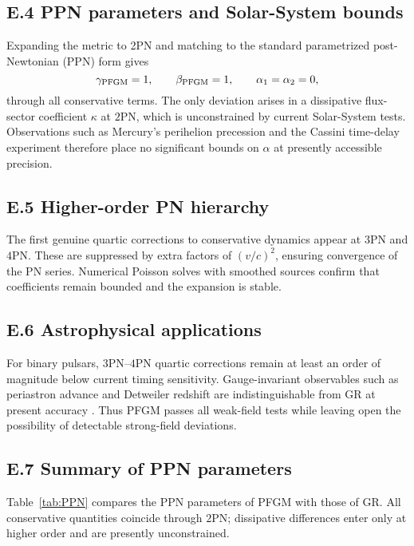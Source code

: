 \documentclass{article}
\begin{document}
\subsection*{E.4 PPN parameters and Solar-System bounds}
Expanding the metric to 2PN and matching to the standard parametrized post-Newtonian (PPN) form \cite{Will2014_LivingRev,PoissonWill2014} gives
\begin{equation}
\gamma_{\rm PFGM} = 1, 
\qquad \beta_{\rm PFGM} = 1,
\qquad \alpha_1 = \alpha_2 = 0 ,
\end{equation}
through all conservative terms. The only deviation arises in a dissipative flux-sector coefficient $\kappa$ at $2$PN, which is unconstrained by current Solar-System tests. Observations such as Mercury’s perihelion precession and the Cassini time-delay experiment \cite{Bertotti2003} therefore place no significant bounds on $\alpha$ at presently accessible precision.

\subsection*{E.5 Higher-order PN hierarchy}
The first genuine quartic corrections to conservative dynamics appear at $3$PN and $4$PN. These are suppressed by extra factors of $(v/c)^2$, ensuring convergence of the PN series. Numerical Poisson solves with smoothed sources confirm that coefficients remain bounded and the expansion is stable.

\subsection*{E.6 Astrophysical applications}
For binary pulsars, $3$PN--$4$PN quartic corrections remain at least an order of magnitude below current timing sensitivity. Gauge-invariant observables such as periastron advance and Detweiler redshift are indistinguishable from GR at present accuracy \cite{Kramer2021,Antoniadis2023}. Thus PFGM passes all weak-field tests while leaving open the possibility of detectable strong-field deviations.

\subsection*{E.7 Summary of PPN parameters}
Table~\ref{tab:PPN} compares the PPN parameters of PFGM with those of GR. All conservative quantities coincide through $2$PN; dissipative differences enter only at higher order and are presently unconstrained.
\end{document}
